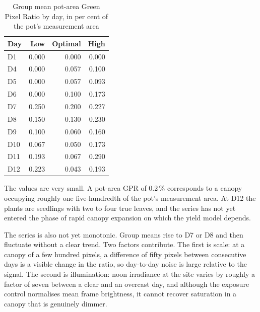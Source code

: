 \begin{table}[ht]
\centering
\caption{Group mean pot-area Green Pixel Ratio by day, in per cent of the
pot's measurement area}
\label{tab:gpr_by_group}
\begin{tabular}{lrrr}
\toprule
\textbf{Day} & \textbf{Low} & \textbf{Optimal} & \textbf{High} \\
\midrule
D1  & 0.000 & 0.000 & 0.000 \\
D4  & 0.000 & 0.057 & 0.100 \\
D5  & 0.000 & 0.057 & 0.093 \\
D6  & 0.000 & 0.100 & 0.173 \\
D7  & 0.250 & 0.200 & 0.227 \\
D8  & 0.150 & 0.130 & 0.230 \\
D9  & 0.100 & 0.060 & 0.160 \\
D10 & 0.067 & 0.050 & 0.173 \\
D11 & 0.193 & 0.067 & 0.290 \\
D12 & 0.223 & 0.043 & 0.193 \\
\bottomrule
\end{tabular}
\end{table}

The values are very small. A pot-area GPR of 0.2\,\% corresponds to a canopy
occupying roughly one five-hundredth of the pot's measurement area. At D12 the
plants are seedlings with two to four true leaves, and the series has not yet
entered the phase of rapid canopy expansion on which the yield model depends.

The series is also not yet monotonic. Group means rise to D7 or D8 and then
fluctuate without a clear trend. Two factors contribute. The first is scale:
at a canopy of a few hundred pixels, a difference of fifty pixels between
consecutive days is a visible change in the ratio, so day-to-day noise is
large relative to the signal. The second is illumination: noon irradiance at
the site varies by roughly a factor of seven between a clear and an overcast
day, and although the exposure control normalises mean frame brightness, it
cannot recover saturation in a canopy that is genuinely dimmer.


